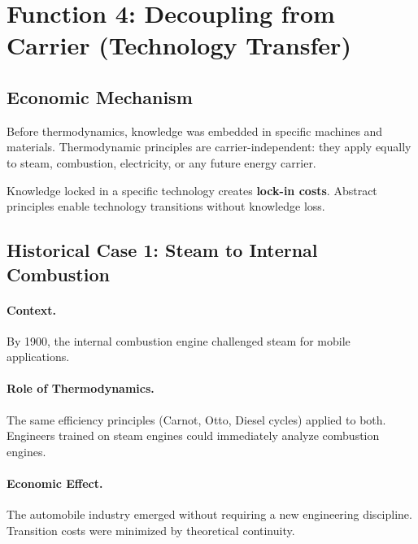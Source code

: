\section{Function 4: Decoupling from Carrier (Technology Transfer)}
\label{sec:thermo-decoupling}

\subsection{Economic Mechanism}

Before thermodynamics, knowledge was embedded in specific machines and
materials. Thermodynamic principles are carrier-independent: they apply
equally to steam, combustion, electricity, or any future energy carrier.

\begin{tcolorbox}[colback=yellow!5!white, colframe=yellow!75!black,
    title=Core Insight: Carrier Independence]
Knowledge locked in a specific technology creates \textbf{lock-in costs}.
Abstract principles enable technology transitions without knowledge loss.
\end{tcolorbox}

\subsection{Historical Case 1: Steam to Internal Combustion}

\paragraph{Context.} By 1900, the internal combustion engine challenged steam
for mobile applications.

\paragraph{Role of Thermodynamics.} The same efficiency principles (Carnot,
Otto, Diesel cycles) applied to both. Engineers trained on steam engines
could immediately analyze combustion engines.

\paragraph{Economic Effect.} The automobile industry emerged without requiring
a new engineering discipline. Transition costs were minimized by theoretical
continuity.

